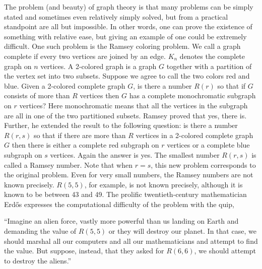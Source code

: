 The problem (and beauty) of graph theory is that many problems can be simply stated and sometimes even relatively simply solved, but from a practical standpoint are all but impossible. In other words, one can prove the existence of something with relative ease, but giving an example of one could be extremely difficult. One such problem is the Ramsey coloring problem. We call a graph complete if every two vertices are joined by an edge. $K_n$ denotes the complete graph on $n$ vertices. A 2-colored graph is a graph $G$ together with a partition of the vertex set into two subsets. Suppose we agree to call the two colors red and blue. Given a 2-colored complete graph $G$, is there a number $R(r)$ so that if $G$ consists of more than $R$ vertices then $G$ has a complete monochromatic subgraph on $r$ vertices? Here monochromatic means that all the vertices in the subgraph are all in one of the two partitioned subsets. Ramsey proved that yes, there is. Further, he extended the result to the following question: is there a number $R(r,s)$ so that if there are more than $R$ vertices in a 2-colored complete graph $G$ then there is either a complete red subgraph on $r$ vertices or a complete blue subgraph on $s$ vertices. Again the answer is yes. The smallest number $R(r,s)$ is called a Ramsey number. Note that when $r= s$, this new problem corresponds to the original problem. Even for very small numbers, the Ramsey numbers are not known precisely. $R(5,5)$, for example, is not known precisely, although it is known to be between 43 and 49. The prolific twentieth-century mathematician Erd\H{o}s expresses the computational difficulty of the problem with the quip, 
	\begin{center}
	\begin{minipage}{0.75\textwidth}
	``Imagine an alien force, vastly more powerful than us landing on Earth and demanding the value of $R(5,5)$ or they will destroy our planet. In that case, we should marshal all our computers and all our mathematicians and attempt to find the value. But suppose, instead, that they asked for $R(6,6)$, we should attempt to destroy the aliens.''
	\end{minipage}
	\end{center}


